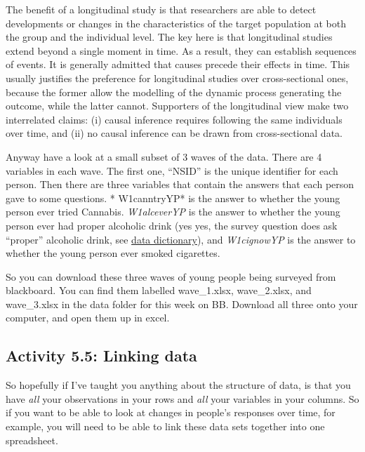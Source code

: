 \documentclass[
]{book}
\begin{document}
The benefit of a longitudinal study is that researchers are able to detect developments or changes in the characteristics of the target population at both the group and the individual level. The key here is that longitudinal studies extend beyond a single moment in time. As a result, they can establish sequences of events. It is generally admitted that causes precede their effects in time. This usually justifies the preference for longitudinal studies over cross-sectional ones, because the former allow the modelling of the dynamic process generating the outcome, while the latter cannot. Supporters of the longitudinal view make two interrelated claims: (i) causal inference requires following the same individuals over time, and (ii) no causal inference can be drawn from cross-sectional data.

Anyway have a look at a small subset of 3 waves of the data. There are 4 variables in each wave. The first one, ``NSID'' is the unique identifier for each person. Then there are three variables that contain the answers that each person gave to some questions. * W1canntryYP* is the answer to whether the young person ever tried Cannabis. \emph{W1alceverYP} is the answer to whether the young person ever had proper alcoholic drink (yes yes, the survey question does ask ``proper'' alcoholic drink, see \href{https://ilsype.sda-ltd.com/ilsype/workspaces/public/datasets/W7YP/variables/W7AlcEverTried}{data dictionary}), and \emph{W1cignowYP} is the answer to whether the young person ever smoked cigarettes.

So you can download these three waves of young people being surveyed from blackboard. You can find them labelled wave\_1.xlsx, wave\_2.xlsx, and wave\_3.xlsx in the data folder for this week on BB. Download all three onto your computer, and open them up in excel.

\hypertarget{activity-5.5-linking-data}{%
\subsection{Activity 5.5: Linking data}\label{activity-5.5-linking-data}}

So hopefully if I've taught you anything about the structure of data, is that you have \emph{all} your observations in your rows and \emph{all} your variables in your columns. So if you want to be able to look at changes in people's responses over time, for example, you will need to be able to link these data sets together into one spreadsheet.
\end{document}
